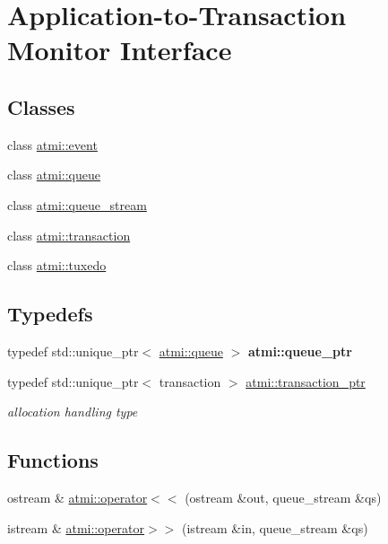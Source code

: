 \hypertarget{group__atmi}{}\section{Application-\/to-\/\+Transaction Monitor Interface}
\label{group__atmi}
\subsection*{Classes}
\begin{DoxyCompactItemize}
\item 
class \hyperlink{classatmi_1_1event}{atmi\+::event}
\item 
class \hyperlink{classatmi_1_1queue}{atmi\+::queue}
\item 
class \hyperlink{classatmi_1_1queue__stream}{atmi\+::queue\+\_\+stream}
\item 
class \hyperlink{classatmi_1_1transaction}{atmi\+::transaction}
\item 
class \hyperlink{classatmi_1_1tuxedo}{atmi\+::tuxedo}
\end{DoxyCompactItemize}
\subsection*{Typedefs}
\begin{DoxyCompactItemize}
\item 
typedef std\+::unique\+\_\+ptr$<$ \hyperlink{classatmi_1_1queue}{atmi\+::queue} $>$ {\bfseries atmi\+::queue\+\_\+ptr}\hypertarget{group__atmi_ga7cfd5961e0e05b148f12be311177a1a8}{}\label{group__atmi_ga7cfd5961e0e05b148f12be311177a1a8}

\item 
typedef std\+::unique\+\_\+ptr$<$ transaction $>$ \hyperlink{group__atmi_gab8e359f2305eaf285b0b0745d3b41997}{atmi\+::transaction\+\_\+ptr}\hypertarget{group__atmi_gab8e359f2305eaf285b0b0745d3b41997}{}\label{group__atmi_gab8e359f2305eaf285b0b0745d3b41997}

\begin{DoxyCompactList}\small\item\em allocation handling type \end{DoxyCompactList}\end{DoxyCompactItemize}
\subsection*{Functions}
\begin{DoxyCompactItemize}
\item 
ostream \& \hyperlink{group__atmi_gaf3fe9481b5d6e19d1fb56e27baff2154}{atmi\+::operator$<$$<$} (ostream \&out, queue\+\_\+stream \&qs)
\item 
istream \& \hyperlink{group__atmi_gadb0ca17e8de1eecddb5c95b86441ffdc}{atmi\+::operator$>$$>$} (istream \&in, queue\+\_\+stream \&qs)
\end{DoxyCompactItemize}


